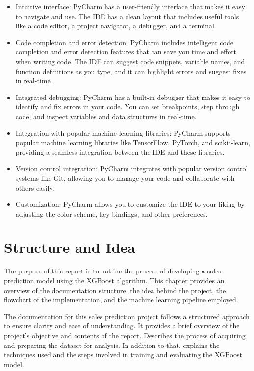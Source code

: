 \begin{itemize}

\item Intuitive interface: PyCharm has a user-friendly interface that makes it easy to navigate and use. The IDE has a clean layout that includes useful tools like a code editor, a project navigator, a debugger, and a terminal.

\item Code completion and error detection: PyCharm includes intelligent code completion and error detection features that can save you time and effort when writing code. The IDE can suggest code snippets, variable names, and function definitions as you type, and it can highlight errors and suggest fixes in real-time.

\item Integrated debugging: PyCharm has a built-in debugger that makes it easy to identify and fix errors in your code. You can set breakpoints, step through code, and inspect variables and data structures in real-time.

\item Integration with popular machine learning libraries: PyCharm supports popular machine learning libraries like TensorFlow, PyTorch, and scikit-learn, providing a seamless integration between the IDE and these libraries.

\item Version control integration: PyCharm integrates with popular version control systems like Git, allowing you to manage your code and collaborate with others easily.

\item Customization: PyCharm allows you to customize the IDE to your liking by adjusting the color scheme, key bindings, and other preferences.

\end{itemize}


\section{Structure and Idea}

	The purpose of this report is to outline the process of developing a sales prediction model using the XGBoost algorithm. This chapter provides an overview of the documentation structure, the idea behind the project, the flowchart of the implementation, and the machine learning pipeline employed.
	
	The documentation for this sales prediction project follows a structured approach to ensure clarity and ease of understanding. It provides a brief overview of the project's objective and contents of the report. Describes the process of acquiring and preparing the dataset for analysis. In addition to that, explains the techniques used and the steps involved in training and evaluating the XGBoost model.
	
